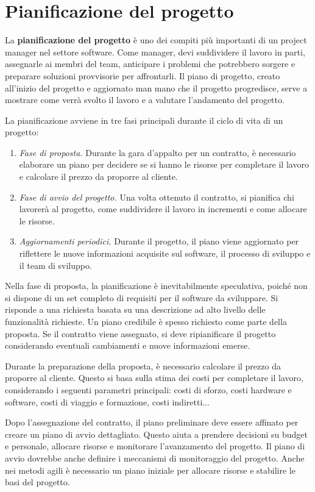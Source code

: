 \chapter{Pianificazione del progetto}
\begin{redbar}
La \textbf{pianificazione del progetto} è uno dei compiti più importanti di un project manager nel settore software. Come manager, devi suddividere il lavoro in parti, assegnarle ai membri del team, anticipare i problemi che potrebbero sorgere e preparare soluzioni provvisorie per affrontarli. Il piano di progetto, creato all'inizio del progetto e aggiornato man mano che il progetto progredisce, serve a mostrare come verrà svolto il lavoro e a valutare l'andamento del progetto.
\end{redbar}

La pianificazione avviene in tre fasi principali durante il ciclo di vita di un progetto:
\begin{enumerate}
    \item \textit{Fase di proposta.} Durante la gara d'appalto per un contratto, è necessario elaborare un piano per decidere se si hanno le risorse per completare il lavoro e calcolare il prezzo da proporre al cliente.
    \item \textit{Fase di avvio del progetto.} Una volta ottenuto il contratto, si pianifica chi lavorerà al progetto, come suddividere il lavoro in incrementi e come allocare le risorse. \item \textit{Aggiornamenti periodici.} Durante il progetto, il piano viene aggiornato per riflettere le nuove informazioni acquisite sul software, il processo di sviluppo e il team di sviluppo.
\end{enumerate}
Nella fase di proposta, la pianificazione è inevitabilmente speculativa, poiché non si dispone di un set completo di requisiti per il software da sviluppare. Si risponde a una richiesta basata su una descrizione ad alto livello delle funzionalità richieste.
Un piano credibile è spesso richiesto come parte della proposta. Se il contratto viene assegnato, si deve ripianificare il progetto considerando eventuali cambiamenti e nuove informazioni emerse.

Durante la preparazione della proposta, è necessario calcolare il prezzo da proporre al cliente. Questo si basa sulla stima dei costi per completare il lavoro, considerando i seguenti parametri principali: costi di sforzo, costi hardware e software, costi di viaggio e formazione, costi indiretti...

Dopo l’assegnazione del contratto, il piano preliminare deve essere affinato per creare un piano di avvio dettagliato. Questo aiuta a prendere decisioni su budget e personale, allocare risorse e monitorare l'avanzamento del progetto. Il piano di avvio dovrebbe anche definire i meccanismi di monitoraggio del progetto. Anche nei metodi agili è necessario un piano iniziale per allocare risorse e stabilire le basi del progetto.

